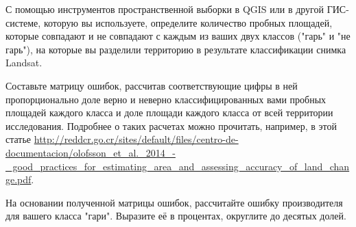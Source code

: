 
С помощью инструментов пространственной выборки в QGIS или в другой ГИС-системе, которую вы используете, определите количество пробных площадей, которые совпадают и не совпадают с каждым из ваших двух классов ("гарь" и "не гарь"), на которые вы разделили территорию в результате классификации снимка Landsat.

Составьте матрицу ошибок, рассчитав соответствующие цифры в ней пропорционально доле верно и неверно классифицированных вами пробных площадей каждого класса и доле площади каждого класса от всей территории исследования. Подробнее о таких расчетах можно прочитать, например, в этой статье \url{http://reddcr.go.cr/sites/default/files/centro-de-documentacion/olofsson_et_al._2014_-_good}\linebreak \url{_practices_for_estimating_area_and_assessing_accuracy_of_land_change.pdf}.

На основании полученной матрицы ошибок, рассчитайте ошибку производителя для вашего класса "гари". Выразите её в процентах, округлите до десятых долей.